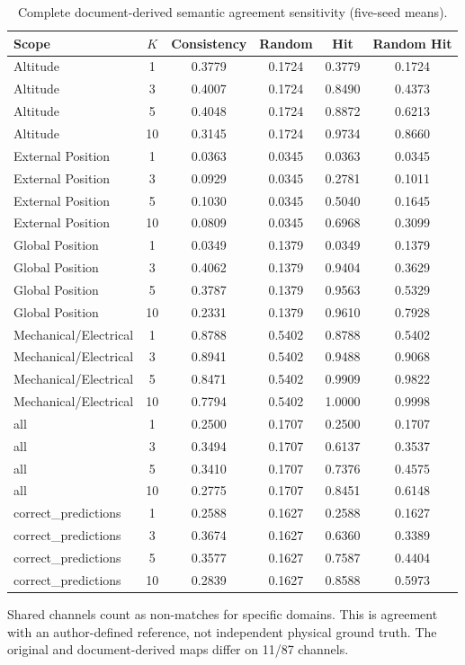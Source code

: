\begin{table}[htbp]
\centering\footnotesize
\caption{Complete document-derived semantic agreement sensitivity (five-seed means).}
\label{tab:s_semantic}
\renewcommand{\arraystretch}{1.15}
\setlength{\tabcolsep}{4pt}
\begin{tabular}{lccccc}
\toprule
Scope & $K$ & Consistency & Random & Hit & Random Hit\\
\midrule
Altitude & 1 & 0.3779 & 0.1724 & 0.3779 & 0.1724\\
Altitude & 3 & 0.4007 & 0.1724 & 0.8490 & 0.4373\\
Altitude & 5 & 0.4048 & 0.1724 & 0.8872 & 0.6213\\
Altitude & 10 & 0.3145 & 0.1724 & 0.9734 & 0.8660\\
External Position & 1 & 0.0363 & 0.0345 & 0.0363 & 0.0345\\
External Position & 3 & 0.0929 & 0.0345 & 0.2781 & 0.1011\\
External Position & 5 & 0.1030 & 0.0345 & 0.5040 & 0.1645\\
External Position & 10 & 0.0809 & 0.0345 & 0.6968 & 0.3099\\
Global Position & 1 & 0.0349 & 0.1379 & 0.0349 & 0.1379\\
Global Position & 3 & 0.4062 & 0.1379 & 0.9404 & 0.3629\\
Global Position & 5 & 0.3787 & 0.1379 & 0.9563 & 0.5329\\
Global Position & 10 & 0.2331 & 0.1379 & 0.9610 & 0.7928\\
Mechanical/Electrical & 1 & 0.8788 & 0.5402 & 0.8788 & 0.5402\\
Mechanical/Electrical & 3 & 0.8941 & 0.5402 & 0.9488 & 0.9068\\
Mechanical/Electrical & 5 & 0.8471 & 0.5402 & 0.9909 & 0.9822\\
Mechanical/Electrical & 10 & 0.7794 & 0.5402 & 1.0000 & 0.9998\\
all & 1 & 0.2500 & 0.1707 & 0.2500 & 0.1707\\
all & 3 & 0.3494 & 0.1707 & 0.6137 & 0.3537\\
all & 5 & 0.3410 & 0.1707 & 0.7376 & 0.4575\\
all & 10 & 0.2775 & 0.1707 & 0.8451 & 0.6148\\
correct\_predictions & 1 & 0.2588 & 0.1627 & 0.2588 & 0.1627\\
correct\_predictions & 3 & 0.3674 & 0.1627 & 0.6360 & 0.3389\\
correct\_predictions & 5 & 0.3577 & 0.1627 & 0.7587 & 0.4404\\
correct\_predictions & 10 & 0.2839 & 0.1627 & 0.8588 & 0.5973\\
\bottomrule
\end{tabular}
\par\smallskip\parbox{0.98\linewidth}{\scriptsize Shared channels count as non-matches for specific domains. This is agreement with an author-defined reference, not independent physical ground truth. The original and document-derived maps differ on 11/87 channels.}
\end{table}
